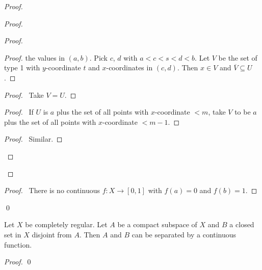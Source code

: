 \begin{example}[Choice]
\begin{proof}
\begin{proof}
\begin{proof}
\begin{proof}
                    the values in $(a,b)$. Pick $c$, $d$ with $a < c < s < d < b$.
                    Let $V$ be the set of type 1 with $y$-coordinate $t$ and $x$-coordinates in $(c,d)$.
                    Then $x \in V$ and $\overline{V} \subseteq U$.
                \end{proof}
                \begin{proof}
                    \pf\ Take $V = U$.
                \end{proof}
                \begin{proof}
                    \pf\ If $U$ is $a$ plus the set of all points with $x$-coordinate $< m$,
                    take $V$ to be $a$ plus the set of all points with $x$-coordinate $< m - 1$.
                \end{proof}
                \begin{proof}
                    \pf\ Similar.
                \end{proof}
            \end{proof}
        \end{proof}
        \begin{proof}
            \pf\ There is no continuous $f : X \rightarrow [0,1]$ with $f(a) = 0$
            and $f(b) = 1$.
        \end{proof}
        \qed
    \end{proof}
\end{example}

\begin{proposition}
    Let $X$ be completely regular. Let $A$ be a compact subspace of $X$ and $B$
    a closed set in $X$ disjoint from $A$. Then $A$ and $B$ can be separated by a
    continuous function.
\end{proposition}

\begin{proof}
    \pf
    \qed
\end{proof}

